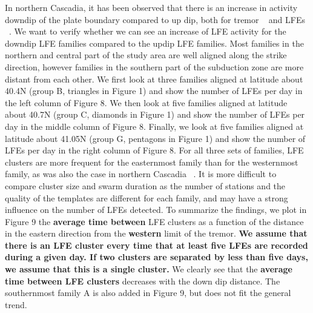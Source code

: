 \documentclass[draft]{agujournal2019}
\begin{document}
In northern Cascadia, it has been observed that there is an increase in activity downdip of the plate boundary compared to up dip, both for tremor ~\cite{WEC_2011} and LFEs ~\cite{SWE_2019}. We want to verify whether we can see an increase of LFE activity for the downdip LFE families compared to the updip LFE families. Most families in the northern and central part of the study area are well aligned along the strike direction, however families in the southern part of the subduction zone are more distant from each other. We first look at three families aligned at latitude about 40.4N (group B, triangles in Figure 1) and show the number of LFEs per day in the left column of Figure 8. We then look at five families aligned at latitude about 40.7N (group C, diamonds in Figure 1) and show the number of LFEs per day in the middle column of Figure 8. Finally, we look at five families aligned at latitude about 41.05N (group G, pentagons in Figure 1) and show the number of LFEs per day in the right column of Figure 8. For all three sets of families, LFE clusters are more frequent for the easternmost family than for the westernmost family, as was also the case in northern Cascadia ~\cite{SWE_2019}. It is more difficult to compare cluster size and swarm duration as the number of stations and the quality of the templates are different for each family, and may have a strong influence on the number of LFEs detected. To summarize the findings, we plot in Figure 9 the \textbf{average time between} LFE clusters as a function of the distance in the eastern direction from the \textbf{western} limit of the tremor. \textbf{We assume that there is an LFE cluster every time that at least five LFEs are recorded during a given day. If two clusters are separated by less than five days, we assume that this is a single cluster.} We clearly see that the \textbf{average time between LFE clusters} decreases with the down dip distance. The southernmost family A is also added in Figure 9, but does not fit the general trend.\\
\end{document}

